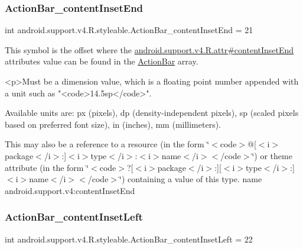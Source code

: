 \subsubsection{\texorpdfstring{Action\+Bar\+\_\+content\+Inset\+End}{ActionBar\_contentInsetEnd}}
{\footnotesize\ttfamily int android.\+support.\+v4.\+R.\+styleable.\+Action\+Bar\+\_\+content\+Inset\+End = 21\hspace{0.3cm}{\ttfamily [static]}}

This symbol is the offset where the \hyperlink{classandroid_1_1support_1_1v4_1_1R_1_1attr_af8f89d4cff9e410c8d717f6c8dd01b0c}{android.\+support.\+v4.\+R.\+attr\#content\+Inset\+End} attribute\textquotesingle{}s value can be found in the \hyperlink{classandroid_1_1support_1_1v4_1_1R_1_1styleable_adc5a3492b9c46265760d7120a04d6afa}{Action\+Bar} array.

\begin{DoxyVerb}      <p>Must be a dimension value, which is a floating point number appended with a unit such as "<code>14.5sp</code>".
\end{DoxyVerb}
 Available units are\+: px (pixels), dp (density-\/independent pixels), sp (scaled pixels based on preferred font size), in (inches), mm (millimeters). 

This may also be a reference to a resource (in the form \char`\"{}$<$code$>$@\mbox{[}$<$i$>$package$<$/i$>$\+:\mbox{]}$<$i$>$type$<$/i$>$\+:$<$i$>$name$<$/i$>$$<$/code$>$\char`\"{}) or theme attribute (in the form \char`\"{}$<$code$>$?\mbox{[}$<$i$>$package$<$/i$>$\+:\mbox{]}\mbox{[}$<$i$>$type$<$/i$>$\+:\mbox{]}$<$i$>$name$<$/i$>$$<$/code$>$\char`\"{}) containing a value of this type.  name android.\+support.\+v4\+:content\+Inset\+End \mbox{\label{classandroid_1_1support_1_1v4_1_1R_1_1styleable_acb50a5936c9ea41ae3f8e43860a37a11}} 
\subsubsection{\texorpdfstring{Action\+Bar\+\_\+content\+Inset\+Left}{ActionBar\_contentInsetLeft}}
{\footnotesize\ttfamily int android.\+support.\+v4.\+R.\+styleable.\+Action\+Bar\+\_\+content\+Inset\+Left = 22\hspace{0.3cm}{\ttfamily [static]}}

